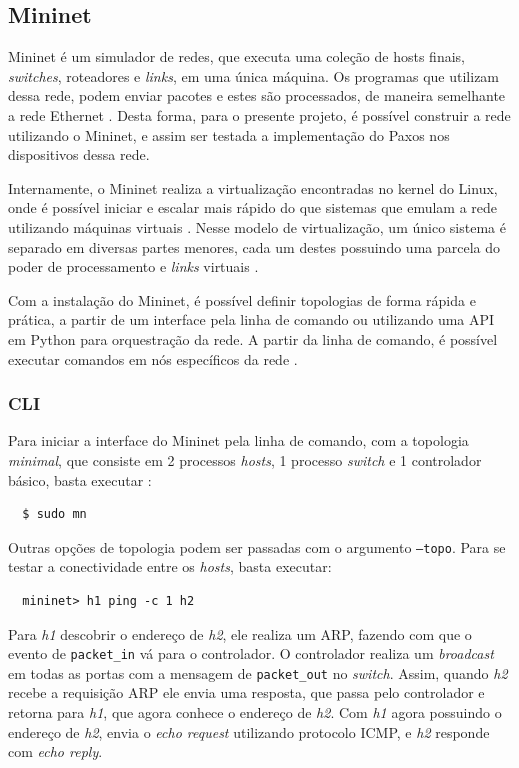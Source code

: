 \documentclass[
    12pt,
    openright, 
    oneside,
    a4paper,
    french,
    english,
    brazil
    ]{facom-ufu-abntex2}
\theoremstyle{definition}
\begin{document}
\subsection{Mininet}
Mininet é um simulador de redes, que executa uma coleção de hosts finais, \emph{switches}, 
roteadores e \emph{links}, em uma única máquina. Os programas que utilizam dessa rede, podem enviar
pacotes e estes são processados, de maneira semelhante a rede Ethernet \cite{mininetDocs}.
Desta forma, para o presente projeto, é possível construir a rede utilizando o Mininet, e 
assim ser testada a implementação do Paxos nos dispositivos dessa rede.

Internamente, o Mininet realiza a virtualização encontradas no kernel do Linux, onde é possível
iniciar e escalar mais rápido do que sistemas que emulam a rede utilizando máquinas virtuais
\cite{mininetDocs}. Nesse modelo de virtualização, um único sistema é separado em diversas
partes menores, cada um destes possuindo uma parcela do poder de processamento e \emph{links} virtuais
\cite{mininetDocs}.

Com a instalação do Mininet, é possível definir topologias de forma rápida e prática, a partir
de um interface pela linha de comando ou utilizando uma API em Python para orquestração da rede.
A partir da linha de comando, é possível executar comandos em nós específicos da rede 
\cite{mininetDocs}. 

\subsubsection{CLI}
Para iniciar a interface do Mininet pela linha de comando, com a topologia
\emph{minimal}, que consiste em 2 processos \emph{hosts}, 1 processo \emph{switch} e 1 controlador
básico, basta executar \cite{mininetOrg}:

\begin{verbatim}
  $ sudo mn
\end{verbatim}

Outras opções de topologia podem ser passadas com o argumento \texttt{--topo}. Para se testar a
conectividade entre os \emph{hosts}, basta executar:

\begin{verbatim}
  mininet> h1 ping -c 1 h2
\end{verbatim}

Para \emph{h1} descobrir o endereço de \emph{h2}, ele realiza um ARP, fazendo com que o evento de 
\texttt{packet\_in} vá para o controlador. O controlador realiza um \emph{broadcast} em todas as portas
com a mensagem de \texttt{packet\_out} no \emph{switch}. Assim, quando \emph{h2} recebe a requisição ARP ele
envia uma resposta, que passa pelo controlador e retorna para \emph{h1}, que agora conhece o endereço
de \emph{h2}. Com \emph{h1} agora possuindo o endereço de \emph{h2}, envia o \emph{echo request} utilizando
protocolo ICMP, e \emph{h2} responde com \emph{echo reply}.
\end{document}

